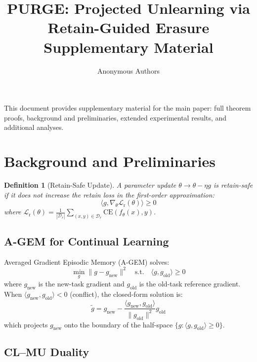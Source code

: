 \documentclass[letterpaper]{article}
\title{PURGE: Projected Unlearning via Retain-Guided Erasure\\Supplementary Material}
\author{Anonymous Authors}
\newcommand{\CE}{\mathrm{CE}}
\newcommand{\Dr}{\mathcal{D}_r}
\newcommand{\lossr}{\mathcal{L}_{\mathrm{r}}}
\newtheorem{definition}{Definition}
\begin{document}
\maketitle

This document provides supplementary material for the main paper: full theorem proofs, background and preliminaries, extended experimental results, and additional analyses.

\section{Background and Preliminaries}

\begin{definition}[Retain-Safe Update]
\label{def:retain_safe}
A parameter update $\theta \to \theta - \eta g$ is \emph{retain-safe} if it does not increase the retain loss in the first-order approximation:
\begin{equation}
    \langle g, \nabla_\theta \lossr(\theta) \rangle \geq 0
\end{equation}
where $\lossr(\theta) = \frac{1}{|\Dr|} \sum_{(x,y) \in \Dr} \CE(f_\theta(x), y)$.
\end{definition}

\subsection{A-GEM for Continual Learning}

Averaged Gradient Episodic Memory (A-GEM) \citep{chaudhry2019agem} solves:
\begin{equation}
    \min_{g} \|g - g_{\text{new}}\|^2 \quad \text{s.t.} \quad \langle g, g_{\text{old}} \rangle \geq 0
\end{equation}
where $g_{\text{new}}$ is the new-task gradient and $g_{\text{old}}$ is the old-task reference gradient. When $\langle g_{\text{new}}, g_{\text{old}} \rangle < 0$ (conflict), the closed-form solution is:
\begin{equation}
    \tilde{g} = g_{\text{new}} - \frac{\langle g_{\text{new}}, g_{\text{old}} \rangle}{\|g_{\text{old}}\|^2} g_{\text{old}}
\end{equation}
which projects $g_{\text{new}}$ onto the boundary of the half-space $\{g : \langle g, g_{\text{old}} \rangle \geq 0\}$.

\subsection{CL--MU Duality}
\end{document}
